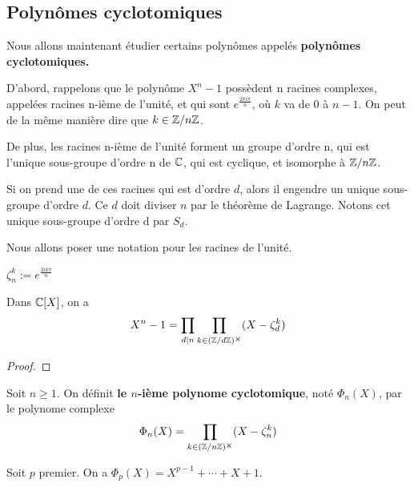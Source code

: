\subsection{Polynômes cyclotomiques}

Nous allons maintenant étudier certains polynômes appelés \textbf{polynômes
cyclotomiques.}

D'abord, rappelons que le polynôme $X^{n} - 1$ possèdent n racines complexes,
appelées racines n-ième de l'unité, et qui sont $e^{\frac{2ki\pi}{n}}$, où $k$ va
de $0$ à $n - 1$. On peut de la même manière dire que $k \in
\mathbb{Z}/n\mathbb{Z}$.

De plus, les racines n-ième de l'unité forment un groupe d'ordre n, qui est
l'unique sous-groupe d'ordre n de $\mathbb{C}$, qui est cyclique, et isomorphe à
$\mathbb{Z}/n\mathbb{Z}$.

Si on prend une de ces racines qui est d'ordre $d$, alors il engendre un
unique sous-groupe d'ordre $d$. Ce $d$ doit diviser $n$ par le théorème de
Lagrange. Notons cet unique sous-groupe d'ordre d par $S_{d}$.

Nous allons poser une notation pour les racines de l'unité.

\begin{notation}
	$\zeta_{n}^{k} := e^{\frac{2 i k \pi}{n}}$
\end{notation}

\begin{proposition}
	Dans $\mathbb{C}[X]$, on a
	\begin{equation}
		X^{n} - 1 = \displaystyle \prod_{d|n} \prod_{k \in (\mathbb{Z}/ d \mathbb{Z})^{\cross}} (X
		- \zeta_{d}^{k})
	\end{equation}
\end{proposition}

\ifdefined\outputproof
\begin{proof}

\end{proof}
\fi

\begin{definition} 
	Soit $n \geq 1$. On définit \textbf{le $n$-ième polynome cyclotomique}, noté
	$\Phi_{n}(X)$, par le polynome complexe
	\begin{equation}
		\Phi_{n}(X) = \prod_{k \in (\mathbb{Z}/ n \mathbb{Z})^{\cross}} (X - \zeta_{n}^{k})
	\end{equation}
\end{definition}

\begin{proposition}
	Soit $p$ premier.
	On a $\Phi_{p}(X) = X^{p - 1} + \cdots + X + 1$.
\end{proposition}

